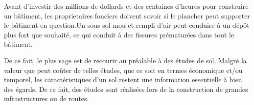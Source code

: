 \par
Avant d’investir des millions de dollards et des centaines d’heures pour 
construire un bâtiment, les proprietaires fonciers doivent savoir si le 
plancher peut supporter le bâtiment en question.Un sous-sol mou et 
rempli d'air peut conduire à un dépôt plus fort que souhaité, ce qui 
conduit à des fissures prématurées dans tout le bâtiment.
\par
De ce fait, le plus sage est de recourir au préalable à des études de sol.   
Malgré la valeur que peut coûter de telles études, que ce soit en termes
économique et/ou temporel, les caractéristiques d’un sol restent une
information essentielle à bien des égards. De ce fait, des études sont 
réalisées lors de la construction de grandes infrastructures ou de routes. 
